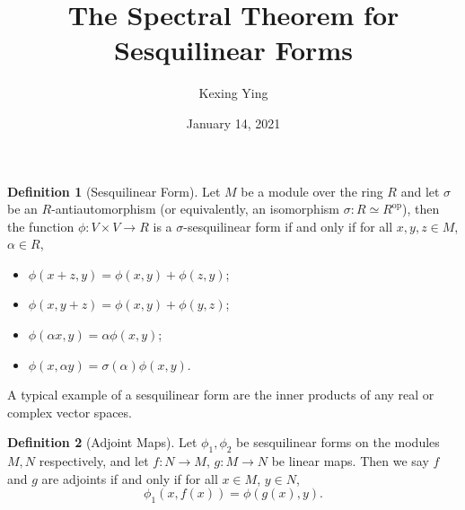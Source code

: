 \documentclass[
]{article}
\title{The Spectral Theorem for Sesquilinear Forms}
\author{Kexing Ying}
\date{January 14, 2021}
\theoremstyle{definition}
\theoremstyle{definition}
\newtheorem{definition}{Definition}[section]
\begin{document}
\maketitle

\begin{definition}[Sesquilinear Form]
  Let \(M\) be a module over the ring \(R\) and let \(\sigma\) be an 
  \(R\)-antiautomorphism (or equivalently, an isomorphism 
  \(\sigma : R \simeq R^{\text{op}}\)), then the function 
  \(\phi : V \times V \to R\) is a \(\sigma\)-sesquilinear form if and only if 
  for all \(x, y, z \in M\), \(\alpha \in R\), 
  \begin{itemize}
    \item \(\phi(x + z, y) = \phi(x, y) + \phi(z, y)\);
    \item \(\phi(x, y + z) = \phi(x, y) + \phi(y, z)\);
    \item \(\phi(\alpha x, y) = \alpha \phi(x, y)\);
    \item \(\phi(x, \alpha y) = \sigma(\alpha) \phi(x, y)\).
  \end{itemize}
\end{definition}

A typical example of a sesquilinear form are the inner products of any real or 
complex vector spaces.

\begin{definition}[Adjoint Maps]
  Let \(\phi_1, \phi_2\) be sesquilinear forms on the modules \(M, N\) respectively, 
  and let \(f : N \to M\), \(g : M \to N\) be linear maps. Then we say \(f\) 
  and \(g\) are adjoints if and only if for all \(x \in M\), \(y \in N\), 
  \[\phi_1(x, f(x)) = \phi(g(x), y).\]
\end{definition}
\end{document}
